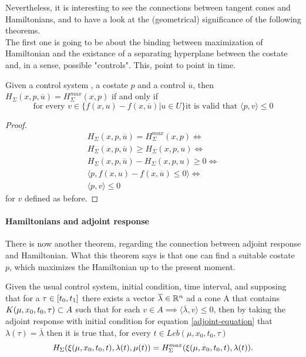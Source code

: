 Nevertheless, it is interesting to see the connections between tangent cones and Hamiltonians, and to have a look at the (geometrical) significance of the following theorems.\\
The first one is going to be about the binding between maximization of Hamiltonian and the existance of a separating hyperplane between the costate and, in a sense, possible "controls". This, point to point in time. 

\begin{teo}
Given a control system \controlSystem, a costate $p$ and a control $\overline{u}$, then\\
$H_\Sigma(x,p,\overline{u})=H_{\Sigma}^{max}(x,p)$ if and only if 
\[ \text{for every }v\in\{f(x,u)-f(x,\overline{u})|u\in U \}\text{it is valid that }\langle p,v \rangle\le0 \]
\label{5-12}
\end{teo}

\begin{proof}
	\begin{gather*}
	H_\Sigma(x,p,\overline{u})=H_{\Sigma}^{max}(x,p) \iff\\
	H_\Sigma(x,p,\overline{u})\ge H_\Sigma(x,p,u) \iff \\
	H_\Sigma(x,p,\overline{u})- H_\Sigma(x,p,u) \ge0 \iff\\
	\langle p,f(x,u)-f(x,\overline{u}) \le 0\rangle \iff\\
	\langle p,v \rangle \leq 0
\end{gather*}
for $v$ defined as before.
\end{proof}


\paragraph[5.13]{Hamiltonians and adjoint response}
There is now another theorem, regarding the connection between adjoint response and Hamiltonian. What this theorem says is that one can find a suitable costate $p$, which maximizes the Hamiltonian up to the present moment.
 \begin{teo}
 	Given the usual control system, initial condition, time interval, and supposing that for a $\tau\in[t_0,t_1]$ there exists a vector $\overline{\lambda}\in\mathbb{R}^n$ ad a cone A that contains $K(\mu,x_0,t_0,\tau)\subset A$ such that for each $v\in A \implies \langle \overline{\lambda},v\rangle\leq0$, then by taking the adjoint response with initial condition for equation \eqref{adjoint-equation} that $\lambda(\tau)=\overline{\lambda}$ then it is true that, for every $t\in Leb(\mu,x_0,t_0,\tau)$
\[ H_\Sigma(\xi(\mu,x_0,t_0,t),\lambda(t),\mu(t))=H_\Sigma^{max}(\xi(\mu,x_0,t_0,t),\lambda(t)). \]
\label{5-13}
 \end{teo}

